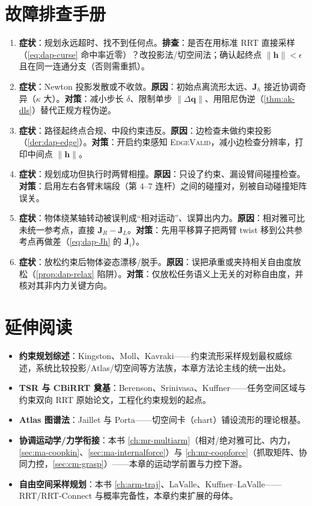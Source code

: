 \section*{故障排查手册}
\begin{enumerate}
  \item \textbf{症状}：规划永远超时、找不到任何点。\textbf{排查}：是否在用标准 RRT 直接采样（\cref{eq:dap-curse} 命中率近零）？改投影法/切空间法；确认起终点 $\|\mathbf{h}\|<\epsilon$ 且在同一连通分支（否则需重抓）。
  \item \textbf{症状}：Newton 投影发散或不收敛。\textbf{原因}：初始点离流形太远、$\mathbf{J}_h$ 接近协调奇异（$\kappa$ 大）。\textbf{对策}：减小步长 $\delta$、限制单步 $\|\Delta\mathbf{q}\|$、用阻尼伪逆（\cref{thm:ak-dls}）替代正规方程伪逆。
  \item \textbf{症状}：路径起终点合规、中段约束违反。\textbf{原因}：边检查未做约束投影（\cref{der:dap-edge}）。\textbf{对策}：开启约束感知 \textsc{EdgeValid}，减小边检查分辨率，打印中间点 $\|\mathbf{h}\|$。
  \item \textbf{症状}：规划成功但执行时两臂相撞。\textbf{原因}：只设了约束、漏设臂间碰撞检查。\textbf{对策}：启用左右各臂末端段（第 $4$--$7$ 连杆）之间的碰撞对，别被自动碰撞矩阵误关。
  \item \textbf{症状}：物体绕某轴转动被误判成“相对运动”、误算出内力。\textbf{原因}：相对雅可比未统一参考点，直接 $\mathbf{J}_R-\mathbf{J}_L$。\textbf{对策}：先用平移算子把两臂 twist 移到公共参考点再做差（\cref{eq:dap-Jh} 的 $\bar{\mathbf{J}}_i$）。
  \item \textbf{症状}：放松约束后物体姿态漂移/脱手。\textbf{原因}：误把承重或夹持相关自由度放松（\cref{prop:dap-relax} 陷阱）。\textbf{对策}：仅放松任务语义上无关的对称自由度，并核对其非内力关键方向。
\end{enumerate}

\section*{延伸阅读}
\begin{itemize}
  \item \textbf{约束规划综述}：Kingston、Moll、Kavraki\cite{kingston2018survey}——约束流形采样规划最权威综述，系统比较投影/Atlas/切空间等方法族，本章方法论主线的统一出处。
  \item \textbf{TSR 与 CBiRRT 奠基}：Berenson、Srinivasa、Kuffner\cite{berenson2011tsr}——任务空间区域与约束双向 RRT 原始论文，工程化约束规划的起点。
  \item \textbf{Atlas 图谱法}：Jaillet 与 Porta\cite{jaillet2013atlas}——切空间卡（chart）铺设流形的理论根基。
  \item \textbf{协调运动学/力学衔接}：本书 \cref{ch:mr-multiarm}（相对/绝对雅可比、内力，\cref{sec:ma-coopkin}、\cref{sec:ma-internalforce}）与 \cref{ch:mr-coopforce}（抓取矩阵、协同力控，\cref{sec:cm-grasp}）——本章的运动学前置与力控下游。
  \item \textbf{自由空间采样规划}：本书 \cref{ch:arm-traj}、LaValle\cite{lavalle2006planning}、Kuffner--LaValle\cite{kuffner2000rrtconnect}——RRT/RRT-Connect 与概率完备性，本章约束扩展的母体。
\end{itemize}
